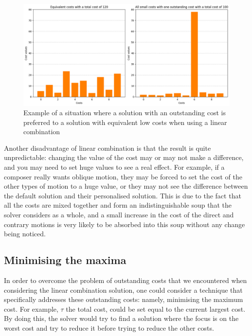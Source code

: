 \begin{figure}[h!]
    \centering
    \includegraphics[width=1\textwidth]{Images/outstanding-costs.png}
    \caption{Example of a situation where a solution with an outstanding cost is preferred to a solution with equivalent low costs when using a linear combination}
    \label{fig:outstanding-cost}
\end{figure}

Another disadvantage of linear combination is that the result is quite unpredictable: changing the value of the cost may or may not make a difference, and you may need to set huge values to see a real effect. For example, if a composer really wants oblique motion, they may be forced to set the cost of the other types of motion to a huge value, or they may not see the difference between the default solution and their personalised solution. This is due to the fact that all the costs are mixed together and form an indistinguishable soup that the solver considers as a whole, and a small increase in the cost of the direct and contrary motions is very likely to be absorbed into this soup without any change being noticed.

\subsection {Minimising the maxima} \label{section:minimising-the-maxima}
In order to overcome the problem of outstanding costs that we encountered when considering the linear combination solution, one could consider a technique that specifically addresses these outstanding costs: namely, minimising the maximum cost. For example, $\tau$ the total cost, could be set equal to the current largest cost. By doing this, the solver would try to find a solution where the focus is on the worst cost and try to reduce it before trying to reduce the other costs.

